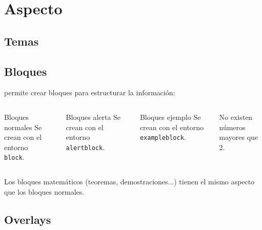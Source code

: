 \section{Aspecto}

\subsection{Temas}

\subsection{Bloques}

\begin{frame}
  \beamer permite crear bloques para estructurar la información:
  \espacio
  \begin{columns}
      \pause
      \begin{block}{Bloques normales}
        Se crean con el entorno \\ \texttt{block}.
      \end{block}

      \pause
      \begin{alertblock}{Bloques alerta}
        Se crean con el entorno \texttt{alertblock}.
      \end{alertblock}

    \pause
    \begin{exampleblock}{Bloques ejemplo}
      Se crean con el entorno \texttt{exampleblock}.
    \end{exampleblock}

    \pause
    \begin{theorem}
      No existen números mayores que 2.
    \end{theorem}

  \end{columns}

  \pause
  \espacio
  Los bloques matemáticos (teoremas, demostraciones...) tienen el mismo aspecto
  que los bloques normales.
\end{frame}

\subsection{Overlays}


